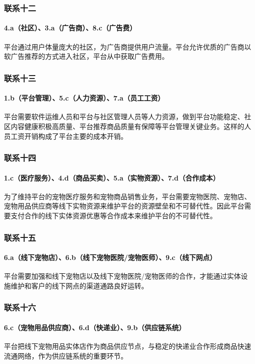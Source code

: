 \documentclass[a4paper]{ctexart}
\begin{document}
\subsubsection{联系十二}
\paragraph{4.a（社区）、3.a（广告商）、8.c（广告费）}平台通过用户体量庞大的社区，为广告商提供用户流量。平台允许优质的广告商以软广告推荐的方式进入社区，平台从中获取广告费用。
\subsubsection{联系十三}
\paragraph{1.b（平台管理）、5.c（人力资源）、7.a（员工工资）}平台需要软件运维人员和平台与社区管理人员等人力资源，做到平台功能稳定、社区内容健康积极高质量、平台推荐商品质量有保障等平台管理关键业务。这样的人员工资开销构成了平台主要的成本开销。
\subsubsection{联系十四}
\paragraph{1.c（医疗服务）、4.d（商品买卖）、5.a（实物资源）、7.d（合作成本）}为了维持平台的宠物医疗服务和宠物商品销售业务，平台需要宠物医院、宠物店、宠物用品供应商等线下实物资源来维护平台的资源壁垒和不可替代性。因此平台需要支付合作的线下实体资源优惠等合作成本来维护平台的不可替代性。
\subsubsection{联系十五}
\paragraph{6.a（线下宠物店）、6.b（线下宠物医院/宠物医师）、9.c（线下网点）}平台需要加强和线下宠物店以及线下宠物医院/宠物医师的合作，才能通过实体设施维护和客户的线下网点的渠道通路良好运转。
\subsubsection{联系十六}
\paragraph{6.c（宠物用品供应商）、6.d（快递业）、9.b（供应链系统）}平台把线下宠物用品实体店作为商品供应节点，与稳定的快递业合作形成商品快速流通网络，作为供应链系统的重要环节。
\end{document}
